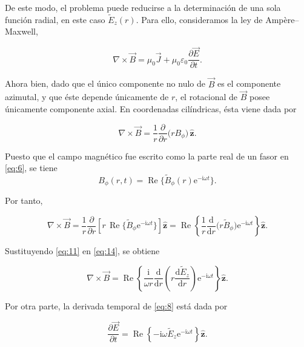 \documentclass{article}
\numberwithin{equation}{section}
\newcommand{\e}{\mathrm{e}}
\newcommand{\iu}{\mathrm{i}}
\newcommand{\ud}{\mathrm{d}}
\newcommand{\pp}[2]{\frac{\partial #1}{\partial #2}}
\newcommand{\hz}{\hat{\mathbf z}}
\begin{document}
De este modo, el problema puede reducirse a la determinación de una sola función radial, en este caso $\widetilde E_z(r)$. Para ello, consideramos la ley de Ampère--Maxwell,

\begin{equation}\tag{12}\label{eq:12}
    \nabla\times \vec B=\mu_0\vec J+\mu_0\varepsilon_0\pp{\vec E}{t}.
\end{equation}

Ahora bien, dado que el único componente no nulo de $\vec B$ es el componente azimutal, y que éste depende únicamente de $r$, el rotacional de $\vec B$ posee únicamente componente axial. En coordenadas cilíndricas, ésta viene dada por

\begin{equation}\tag{13}\label{eq:13}
    \nabla\times \vec B=\frac{1}{r}\frac{\partial}{\partial r}\bigl(rB_{\phi}\bigr)\,\hz.
\end{equation}

Puesto que el campo magnético fue escrito como la parte real de un fasor en \eqref{eq:6}, se tiene
\begin{equation*}
    B_{\phi}(r,t)=\operatorname{Re}\{\widetilde B_{\phi}(r)\e^{-\iu\omega t}\}.
\end{equation*}

Por tanto,

\begin{equation}\tag{14}\label{eq:14}
    \nabla\times \vec B
    =\frac{1}{r}\frac{\partial}{\partial r}\left[r\,\operatorname{Re}\{\widetilde B_{\phi}\e^{-\iu\omega t}\}\right]\hz
    =\operatorname{Re}\left\{\frac{1}{r}\frac{\ud}{\ud r}\bigl(r\widetilde B_{\phi}\bigr)\e^{-\iu\omega t}\right\}\hz.
\end{equation}

Sustituyendo \eqref{eq:11} en \eqref{eq:14}, se obtiene

\begin{equation}\tag{15}\label{eq:15}
    \nabla\times \vec B=\operatorname{Re}\left\{\frac{\iu}{\omega r}\frac{\ud}{\ud r}\left(r\frac{\ud \widetilde E_z}{\ud r}\right)\e^{-\iu\omega t}\right\}\hz.
\end{equation}

Por otra parte, la derivada temporal de \eqref{eq:8} está dada por

\begin{equation}\tag{16}\label{eq:16}
    \pp{\vec E}{t}=\operatorname{Re}\left\{-\iu\omega\widetilde E_z\e^{-\iu\omega t}\right\}\hz.
\end{equation}
\end{document}

